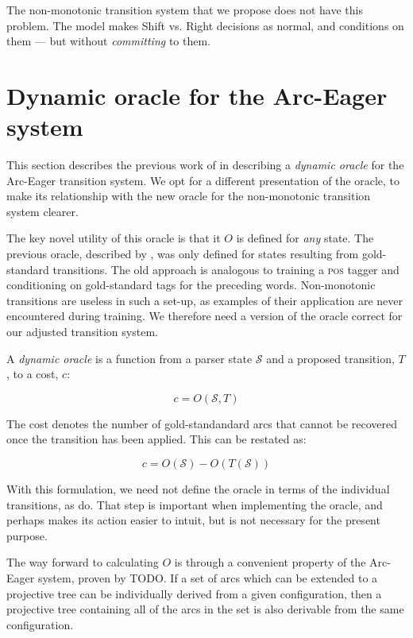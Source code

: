\documentclass[11pt,letterpaper]{article}
\newcommand{\pos}{\textsc{pos}\xspace}
\newcommand{\state}{\mathcal{S}}
\begin{document}
The non-monotonic transition system that we propose does not have this problem.
The model makes Shift vs. Right decisions as normal, and conditions on them --- but
without \emph{committing} to them.


\section{Dynamic oracle for the Arc-Eager system}
\label{ref:oracle}

This section describes the previous work of \citet{goldberg:12} in describing
a \emph{dynamic oracle} for the Arc-Eager transition system.
We opt for a different presentation of the oracle,
to make its relationship with the new oracle for the non-monotonic transition
system clearer.

The key novel utility of this oracle is that it
$O$ is defined for \emph{any} state. The previous oracle, described by 
\citet{nivre:04}, was only defined for states resulting from gold-standard
transitions. The old approach is analogous to training a \pos tagger
and conditioning on gold-standard tags for the preceding words.
Non-monotonic transitions are useless in such a set-up, as examples of their
application are never encountered during training. We therefore need a version
of the oracle correct for our adjusted transition system.

A \emph{dynamic oracle} is a function
from a parser state $\state$ and a proposed transition, $T$, to a cost, $c$:

\begin{equation}
c = O(\state, T)
\end{equation}

The cost denotes the number of gold-standandard arcs that cannot be
recovered once the transition has been applied. This can be restated as:

\begin{equation}
c = O(\state) - O(T(\state))
\end{equation}

With this formulation, we need not define the oracle in terms of the individual
transitions, as \citet{goldberg:12} do. That step is important when implementing
the oracle, and perhaps makes its action easier to intuit,
but is not necessary for the present purpose.

The way forward to calculating $O$ is through a
convenient property of the 
Arc-Eager system, proven by TODO.  If a
set of arcs which can be extended to a projective tree can be individually
derived from a given configuration, then a projective tree containing all of
the arcs in the set is also derivable from the same configuration.
\end{document}
